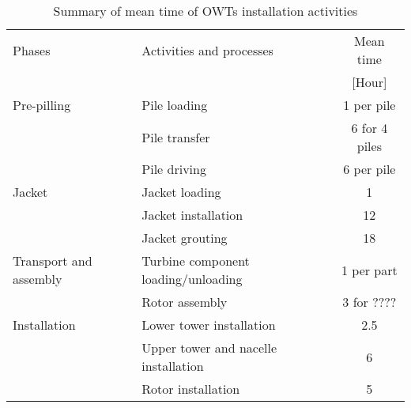 
\begin{table}
\label{tab:times}

\begin{tabular}{llc}
\hline 
Phases & Activities and processes & Mean time \\ 
& & [Hour] \\ 
\hline 
Pre-pilling & Pile loading & 1 per pile \\
 & Pile transfer & 6 for 4 piles\\
 & Pile driving & 6 per pile\\
\hline
Jacket & Jacket loading & 1\\
 & Jacket installation & 12\\
 & Jacket grouting & 18\\
\hline
Transport and assembly & Turbine component loading/unloading & 1 per part\\
 & Rotor assembly & 3 for ???? \\
\hline
Installation & Lower tower installation & 2.5\\
 & Upper tower and nacelle installation & 6\\
 & Rotor installation & 5\\
\hline 
\end{tabular} 

\caption{Summary of mean time of OWTs installation activities}
\end{table}
